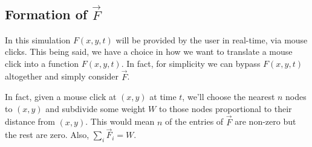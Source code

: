 \subsection{Formation of $\vec{F}$}
In this simulation $F(x,y,t)$ will be provided by the user in real-time, via mouse clicks. This being said, we have a
choice in how we want to translate a mouse click into a function $F(x,y,t)$. In fact, for simplicity we can bypass
$F(x,y,t)$ altogether and simply consider $\vec{F}$.

In fact, given a mouse click at $(x,y)$ at time $t$, we'll choose the nearest $n$ nodes to $(x,y)$ and subdivide some 
weight $W$ to those nodes proportional to their distance from $(x,y)$. This would mean $n$ of the entries of $\vec{F}$
are non-zero but the rest are zero. Also, $\sum\limits_i\vec{F}_i = W$.
